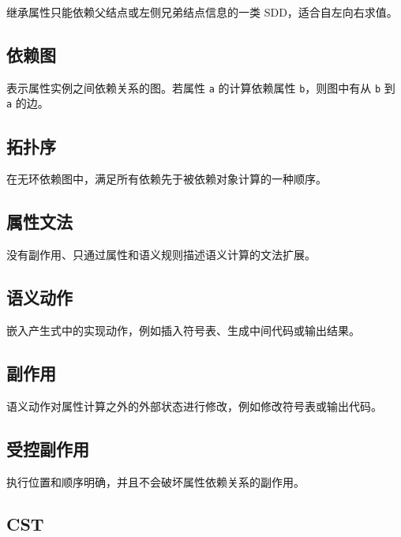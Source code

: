 \documentclass[UTF8,zihao=-4]{ctexart}
\begin{document}
继承属性只能依赖父结点或左侧兄弟结点信息的一类 SDD，适合自左向右求值。

\subsection*{依赖图}

表示属性实例之间依赖关系的图。若属性 \texttt{a} 的计算依赖属性 \texttt{b}，则图中有从 \texttt{b} 到 \texttt{a} 的边。

\subsection*{拓扑序}

在无环依赖图中，满足所有依赖先于被依赖对象计算的一种顺序。

\subsection*{属性文法}

没有副作用、只通过属性和语义规则描述语义计算的文法扩展。

\subsection*{语义动作}

嵌入产生式中的实现动作，例如插入符号表、生成中间代码或输出结果。

\subsection*{副作用}

语义动作对属性计算之外的外部状态进行修改，例如修改符号表或输出代码。

\subsection*{受控副作用}

执行位置和顺序明确，并且不会破坏属性依赖关系的副作用。

\subsection*{CST}
\end{document}
